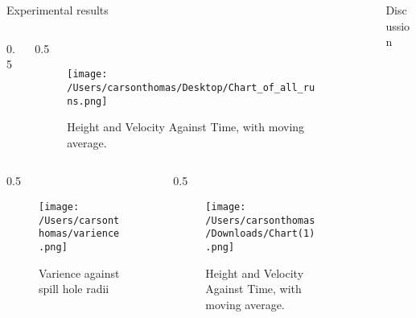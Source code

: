 \documentclass[final]{beamer}
\newlength{\sepwidth}
\newlength{\colwidth}
\newcommand{\separatorcolumn}{\begin{column}{\sepwidth}\end{column}}
\begin{document}
\begin{frame}[t]
\begin{columns}[t]
\begin{column}{\colwidth}
\begin{block}{Experimental results}
\begin{columns}[t]
\begin{column}{0.5\colwidth}
\end{column}
\hspace{10pt} %
\begin{column}{0.5\colwidth}
\vspace{0pt} %
       \begin{figure}
        \centering
        \texttt{[image: /Users/carsonthomas/Desktop/Chart\_of\_all\_runs.png]}
        \caption{Height and Velocity Against Time, with moving average.}
        \label{fig:Figure 2}
    \end{figure}
  \end{column}
\end{columns}
\begin{columns}[t]
\hspace{20pt} %
\begin{column}{0.5\colwidth}
   \begin{figure}
        \centering
        \texttt{[image: /Users/carsonthomas/varience.png]}
        \caption{Varience against spill hole radii}
        \label{fig:example}
    \end{figure}
\end{column}
\hspace{10pt} %
\begin{column}{0.5\colwidth}
\vspace{0pt} %
     \begin{figure}
        \centering
        \texttt{[image: /Users/carsonthomas/Downloads/Chart(1).png]}
        \caption{Height and Velocity Against Time, with moving average.}
        \label{fig:Figure 3}
    \end{figure}

  \end{column}
\end{columns}
       
  \end{block}



\end{column}

\separatorcolumn

\begin{column}{\colwidth}

  \begin{block}{Discussion}


\end{block}
\end{column}
\end{columns}
\end{frame}
\end{document}
